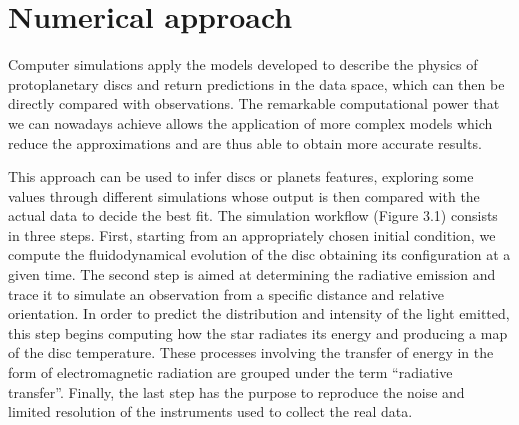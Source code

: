 \documentclass[a4paper,10pt]{report}
\begin{document}
\section{Numerical approach}

Computer simulations apply the models developed to describe the physics of protoplanetary discs 
and return predictions in the data space, which can then be directly compared with observations.
The remarkable computational power that we can nowadays achieve allows the application of
more complex models which reduce the approximations and are thus able to obtain more 
accurate results.

This approach can be used to infer discs or planets features, exploring some values through different simulations
whose output is then compared with the actual data to decide the best fit.
The simulation workflow (Figure 3.1) consists in three steps. 
First, starting from an appropriately chosen initial condition,
we compute the fluidodynamical evolution of the disc obtaining its configuration
at a given time. The second step is aimed at determining the radiative emission and trace it 
to simulate an observation from a specific distance and relative orientation.
In order to predict the distribution and intensity of the light emitted, this step begins computing
how the star radiates its energy and producing a map of the disc temperature. These processes involving the
transfer of energy in the form of electromagnetic radiation are grouped under the term ``radiative transfer''.
Finally, the last step has the purpose to reproduce the noise and limited resolution of the instruments 
used to collect the real data.
\end{document}
